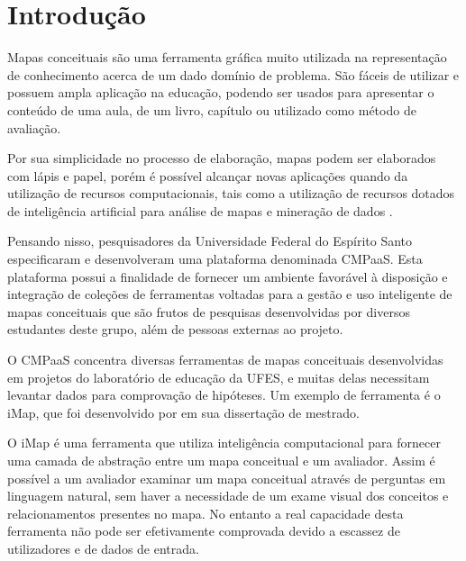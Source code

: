 \documentclass[
	12pt,				%
	openright,			%
	oneside,			%
	a4paper,			%
	english,			%
	french,				%
	spanish,			%
	brazil				%
	]{abntex2}
\begin{document}
\chapter{Introdução}

Mapas conceituais são uma ferramenta gráfica muito utilizada na representação de conhecimento acerca de um dado domínio de problema. São fáceis de utilizar e possuem ampla aplicação na educação, podendo ser usados para apresentar o conteúdo de uma aula, de um livro, capítulo ou utilizado como método de avaliação.

Por sua simplicidade no processo de elaboração, mapas podem ser elaborados com lápis e papel, porém é possível alcançar novas aplicações quando da utilização de recursos computacionais, tais como a utilização de recursos dotados de inteligência artificial para análise de mapas \cite{de2013construindo} e mineração de dados \cite{yoo2012mining}.

Pensando nisso, pesquisadores da Universidade Federal do Espírito Santo especificaram e desenvolveram uma plataforma denominada CMPaaS. Esta plataforma possui a finalidade de fornecer um ambiente favorável à disposição e integração de coleções de ferramentas voltadas para a gestão e uso inteligente de mapas conceituais que são frutos de pesquisas desenvolvidas por diversos estudantes deste grupo, além de pessoas externas ao projeto.

O CMPaaS concentra diversas ferramentas de mapas conceituais desenvolvidas em projetos do laboratório de educação da UFES, e muitas delas necessitam levantar dados para comprovação de hipóteses. Um exemplo de ferramenta é o iMap, que foi desenvolvido por  em sua dissertação de mestrado.  

O iMap é uma ferramenta que utiliza inteligência computacional para fornecer uma camada de abstração entre um mapa conceitual e um avaliador. Assim é possível a um avaliador examinar um mapa conceitual através de perguntas em linguagem natural, sem haver a necessidade de um exame visual dos conceitos e relacionamentos presentes no mapa. No entanto a real capacidade desta ferramenta não pode ser efetivamente comprovada devido a escassez de utilizadores e de dados de entrada.
\end{document}
